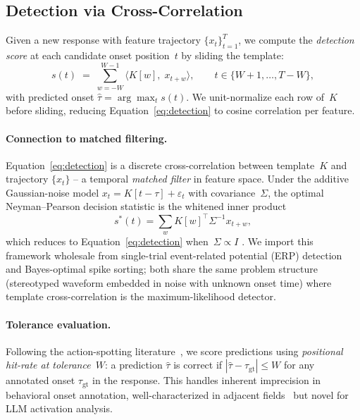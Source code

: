 \subsection{Detection via Cross-Correlation}
\label{sec:detection}

Given a new response with feature trajectory $\{x_t\}_{t=1}^{T}$, we compute
the \emph{detection score} at each candidate onset position~$t$ by sliding
the template:
\begin{equation}
  \label{eq:detection}
  s(t)
  \;=\;
  \sum_{w=-W}^{W-1}
  \bigl\langle K[w],\; x_{t+w} \bigr\rangle,
  \qquad
  t \in \{W+1,\ldots,T-W\},
\end{equation}
with predicted onset $\hat{\tau} = \arg\max_t s(t)$. We unit-normalize
each row of~$K$ before sliding, reducing Equation~\eqref{eq:detection} to
cosine correlation per feature.

\paragraph{Connection to matched filtering.}
Equation~\eqref{eq:detection} is a discrete cross-correlation between
template~$K$ and trajectory $\{x_t\}$ -- a temporal \emph{matched filter}
in feature space. Under the additive Gaussian-noise model
$x_t = K[t-\tau] + \varepsilon_t$ with covariance~$\Sigma$, the optimal
Neyman--Pearson decision statistic is the whitened inner product
\begin{equation}
  s^{*}(t) = \sum_{w} K[w]^\top \Sigma^{-1} x_{t+w},
\end{equation}
which reduces to Equation~\eqref{eq:detection} when~$\Sigma \propto I$
\citep{parra2005recipes, franke2015bayes}. We import this framework wholesale
from single-trial event-related potential (ERP) detection and
Bayes-optimal spike sorting; both share the same problem structure
(stereotyped waveform embedded in noise with unknown onset time) where
template cross-correlation is the maximum-likelihood detector.

\paragraph{Tolerance evaluation.}
Following the action-spotting literature~\citep{giancola2018soccernet}, we
score predictions using \emph{positional hit-rate at tolerance~$W$}: a
prediction $\hat{\tau}$ is correct if $|\hat{\tau} - \tau_{\mathrm{gt}}| \le W$
for any annotated onset $\tau_{\mathrm{gt}}$ in the response. This handles
inherent imprecision in behavioral onset annotation, well-characterized in
adjacent fields~\citep{schroeter2021misaligned} but novel for LLM activation
analysis.

